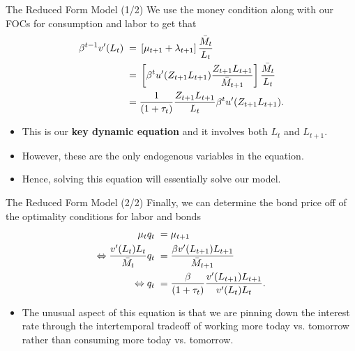 \documentclass[10pt,c,aspectratio=1610,handout]{beamer}
\begin{document}
\begin{frame}{The Reduced Form Model (1/2)}%
  We use the money condition along with our FOCs for consumption and labor to get that%
  \begin{align}%
    \beta^{t-1} v^{\prime} (L_{t}) \; = & \; \left[ \mu_{t+1} + \lambda_{t+1} \right] \frac{\bar{M}_{t}}{L_{t}} \notag\\%
    = & \;\left[ \beta^t u^{\prime} (Z_{t+1}L_{t+1}) \frac{Z_{t+1}L_{t+1}}{\bar{M}_{t+1}} \right] \frac{\bar{M}_{t}}{L_{t}} \notag\\%
    = & \; \frac{1}{(1+\tau_{t})} \frac{Z_{t+1}L_{t+1}}{L_{t}} \beta^{t} u^{\prime} (Z_{t+1}L_{t+1}). \label{eq:key_1}%
  \end{align}%
  \pause%
  \begin{itemize}%
    \item[$\blacktriangleright$] This is our \textbf{key dynamic equation} and it involves both $L_{t}$ and $L_{t+1}.$%
    \item[$\blacktriangleright$] However, these are the only endogenous variables in the equation.%
    \item[$\blacktriangleright$] Hence, solving this equation will essentially solve our model.%
  \end{itemize}%
\end{frame}%
\begin{frame}{The Reduced Form Model (2/2)}%
  Finally, we can determine the bond price off of the optimality conditions for labor and bonds%
  \begin{align}%
    \mu_{t} q_{t} \; = & \; \mu_{t+1} \notag\\%
    \Leftrightarrow \frac{v^{\prime} (L_{t}) L_{t}}{\bar{M}_{t}} q_{t} \; = & \; \frac{\beta v^{\prime} (L_{t+1}) L_{t+1}}{\bar{M}_{t+1}} \notag\\%
    \Leftrightarrow q_{t} \; = & \; \frac{\beta}{(1+\tau_{t})} \frac{v^{\prime} (L_{t+1}) L_{t+1}}{v^{\prime} (L_{t}) L_{t}}. \label{eq:key_2}%
  \end{align}%
  \begin{itemize}%
    \item[$\Rightarrow$] The unusual aspect of this equation is that we are pinning down the interest rate through the intertemporal tradeoff of working more today vs. tomorrow rather than consuming more today vs. tomorrow.%
  \end{itemize}%
\end{frame}%
\end{document}
